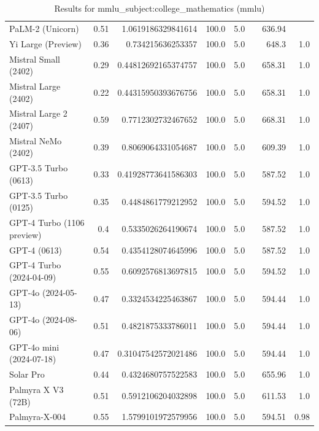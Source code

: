 \begin{table}[htp]
{\begin{tabular}{lrrrrrrr}
PaLM-2 (Unicorn) & 0.51 & 1.0619186329841614 & 100.0 & 5.0 &  & 636.94 &  \\
Yi Large (Preview) & 0.36 & 0.734215636253357 & 100.0 & 5.0 &  & 648.3 & 1.0 \\
Mistral Small (2402) & 0.29 & 0.44812692165374757 & 100.0 & 5.0 &  & 658.31 & 1.0 \\
Mistral Large (2402) & 0.22 & 0.44315950393676756 & 100.0 & 5.0 &  & 658.31 & 1.0 \\
Mistral Large 2 (2407) & 0.59 & 0.7712302732467652 & 100.0 & 5.0 &  & 668.31 & 1.0 \\
Mistral NeMo (2402) & 0.39 & 0.8069064331054687 & 100.0 & 5.0 &  & 609.39 & 1.0 \\
GPT-3.5 Turbo (0613) & 0.33 & 0.41928773641586303 & 100.0 & 5.0 &  & 587.52 & 1.0 \\
GPT-3.5 Turbo (0125) & 0.35 & 0.4484861779212952 & 100.0 & 5.0 &  & 594.52 & 1.0 \\
GPT-4 Turbo (1106 preview) & 0.4 & 0.5335026264190674 & 100.0 & 5.0 &  & 587.52 & 1.0 \\
GPT-4 (0613) & 0.54 & 0.4354128074645996 & 100.0 & 5.0 &  & 587.52 & 1.0 \\
GPT-4 Turbo (2024-04-09) & 0.55 & 0.6092576813697815 & 100.0 & 5.0 &  & 594.52 & 1.0 \\
GPT-4o (2024-05-13) & 0.47 & 0.3324534225463867 & 100.0 & 5.0 &  & 594.44 & 1.0 \\
GPT-4o (2024-08-06) & 0.51 & 0.4821875333786011 & 100.0 & 5.0 &  & 594.44 & 1.0 \\
GPT-4o mini (2024-07-18) & 0.47 & 0.31047542572021486 & 100.0 & 5.0 &  & 594.44 & 1.0 \\
Solar Pro & 0.44 & 0.4324680757522583 & 100.0 & 5.0 &  & 655.96 & 1.0 \\
Palmyra X V3 (72B) & 0.51 & 0.5912106204032898 & 100.0 & 5.0 &  & 611.53 & 1.0 \\
Palmyra-X-004 & 0.55 & 1.5799101972579956 & 100.0 & 5.0 &  & 594.51 & 0.98 \\
\bottomrule
\end{tabular}}
\caption{Results for mmlu_subject:college_mathematics (mmlu)}
\label{fig:mmlu_subject:college_mathematics (mmlu)}
\end{table}